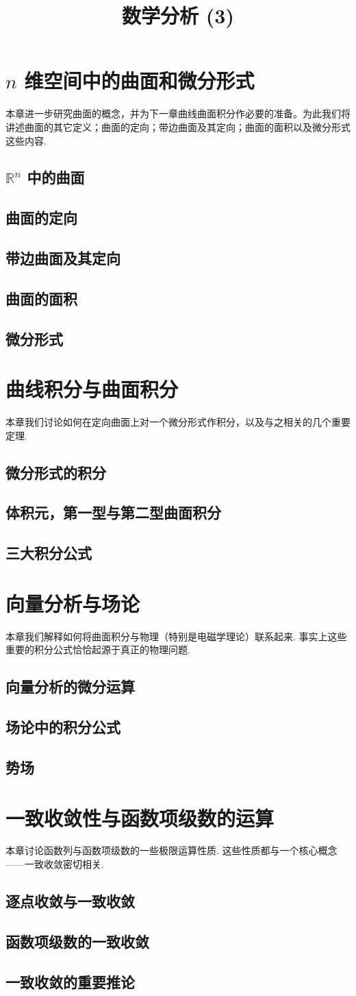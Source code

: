 \documentclass{ctexrep}
\title{数学分析 (3)}
\theoremstyle{examplestyle}
\theoremstyle{hintstyle}
\newcommand{\mychapter}[1]{{\color{mydarkblue}\chapter{#1}}}
\newcommand{\mysection}[1]{{\color{mydarkblue}\section{#1}}}
\newcommand{\RR}{\mathbb{R}}
\begin{document}
\maketitle
\tableofcontents

\setcounter{chapter}{11}
\mychapter{$n$ 维空间中的曲面和微分形式}

本章进一步研究曲面的概念，并为下一章曲线曲面积分作必要的准备。为此我们将讲述曲面的其它定义；曲面的定向；带边曲面及其定向；曲面的面积以及微分形式这些内容.

\mysection{$\RR^n$ 中的曲面}



\mysection{曲面的定向}



\mysection{带边曲面及其定向}



\mysection{曲面的面积}



\mysection{微分形式}



\mychapter{曲线积分与曲面积分}

本章我们讨论如何在定向曲面上对一个微分形式作积分，以及与之相关的几个重要定理.

\mysection{微分形式的积分}



\mysection{体积元，第一型与第二型曲面积分}



\mysection{三大积分公式}



\mychapter{向量分析与场论}

本章我们解释如何将曲面积分与物理（特别是电磁学理论）联系起来. 事实上这些重要的积分公式恰恰起源于真正的物理问题.

\mysection{向量分析的微分运算}



\mysection{场论中的积分公式}



\mysection{势场}



\setcounter{chapter}{15}
\mychapter{一致收敛性与函数项级数的运算}

本章讨论函数列与函数项级数的一些极限运算性质. 这些性质都与一个核心概念——一致收敛密切相关.

\mysection{逐点收敛与一致收敛}



\mysection{函数项级数的一致收敛}



\mysection{一致收敛的重要推论}


\end{document}
